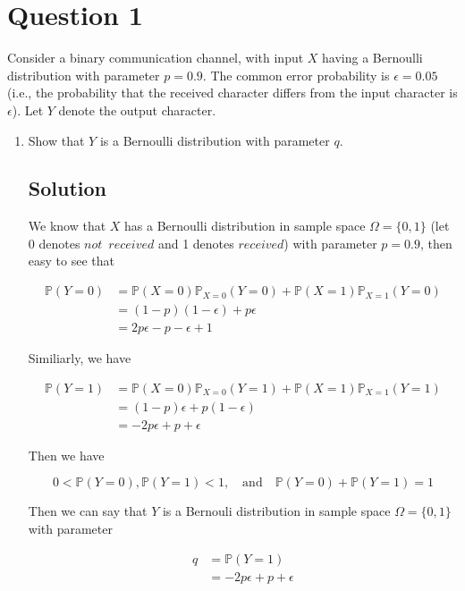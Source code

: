 \documentclass[12pt]{article}
\newcommand{\bP}{\mathbb{P}}
\begin{document}
	
	\section*{Question 1}
	
	\noindent Consider a binary communication channel, with input $X$ having a Bernoulli distribution with parameter $p = 0.9$. The common error probability is $\epsilon = 0.05$ (i.e., the probability that the received character differs from the input character is $\epsilon$). Let $Y$ denote the output character.
	
	\bigskip
	
	\begin{enumerate}[start=1,label={\bfseries Part \arabic*:},leftmargin=0in]
		\bigskip\item Show that $Y$ is a Bernoulli distribution with parameter $q$.
		
		\subsection*{Solution}
		
			We know that $X$ has a Bernoulli distribution in sample space $\Omega = \{0,1\}$ (let 0 denotes $not\enspace received$ and 1 denotes $received$) with parameter $p = 0.9$, then easy to see that
			
			\[
			\begin{aligned}
				\bP(Y=0) &= \bP(X=0)\bP_{X=0}(Y=0) + \bP(X=1)\bP_{X=1}(Y=0)\\
				&= (1-p)(1-\epsilon) + p\epsilon\\
				&= 2p\epsilon - p - \epsilon + 1
			\end{aligned}
			\]
			
			Similiarly, we have
			
			\[
			\begin{aligned}
				\bP(Y=1) &= \bP(X=0)\bP_{X=0}(Y=1) + \bP(X=1)\bP_{X=1}(Y=1)\\
				&= (1-p)\epsilon + p(1-\epsilon)\\
				&= -2p\epsilon + p + \epsilon
			\end{aligned}
			\]
			
			Then we have
			
			\[
				0 < \bP(Y=0), \bP(Y=1) < 1,\quad\text{and}\quad \bP(Y=0) + \bP(Y=1) = 1
			\]
			
			Then we can say that $Y$ is a Bernouli distribution in sample space $\Omega = \{0,1\}$ with parameter
			
			\[
			\begin{aligned}
				q &= \bP(Y = 1)\\
				&= -2p\epsilon + p + \epsilon
			\end{aligned}
			\]
		

\end{enumerate}
\end{document}
